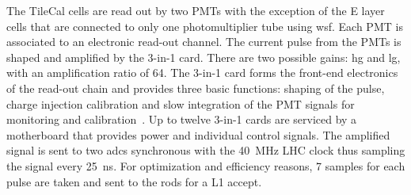 The TileCal cells are read out by two PMTs with the exception of the E layer
cells that are connected to only one photomultiplier tube using \gls{wsf}. Each
PMT is associated to an electronic read-out channel. The current pulse from the
PMTs is shaped and amplified by the 3-in-1 card. There are two possible gains:
\gls{hg} and \gls{lg}, with an amplification ratio of 64. The 3-in-1 card forms
the front-end electronics of the read-out chain and provides three basic
functions: shaping of the pulse, charge injection calibration and slow
integration of the PMT signals for monitoring and calibration~\cite{TileCal}. Up
to twelve 3-in-1 cards are serviced by a motherboard that provides power and
individual control signals.  The amplified signal is sent to two \glspl{adc}
synchronous with the 40~MHz LHC clock thus sampling the signal every 25~ns. For
optimization and efficiency reasons, 7 samples for each pulse are taken and sent
to the \glspl{rod} for a L1 accept.
